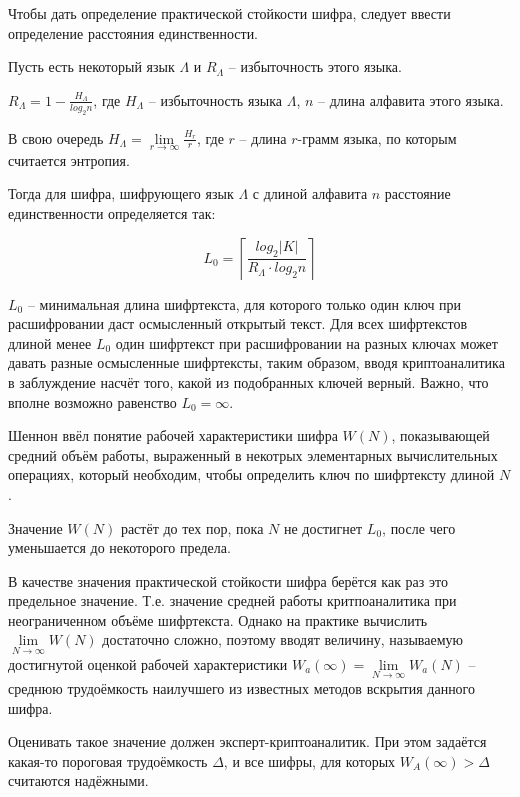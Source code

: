Чтобы дать определение практической стойкости шифра, следует ввести определение расстояния единственности.

Пусть есть некоторый язык $\Lambda$ и $R_{\Lambda}$ -- избыточность этого языка. 

$R_\Lambda = 1 - \frac{H_\Lambda}{log_2n}$, где $H_\Lambda$ -- избыточность языка $\Lambda$, $n$ -- длина алфавита этого языка.

В свою очередь $H_\Lambda =  \lim\limits_{r \rightarrow \infty} \frac{H_r}{r}$, где $r$ -- длина $r$-грамм языка, по которым считается энтропия. 

Тогда для шифра, шифрующего язык $\Lambda$ с длиной алфавита $n$ расстояние единственности определяется так:

$$ L_0 = \left \lceil \frac{log_2|K|}{R_\Lambda \cdot log_2n} \right \rceil $$ 

$L_0$ -- минимальная длина шифртекста, для которого только один ключ при расшифровании даст осмысленный открытый текст. Для всех шифртекстов длиной менее $L_0$ один шифртекст при расшифровании на разных ключах может давать разные осмысленные шифртексты, таким образом, вводя криптоаналитика в заблуждение насчёт того, какой из подобранных ключей верный. Важно, что вполне возможно равенство $L_0 = \infty$.

Шеннон ввёл понятие рабочей характеристики шифра $W(N)$, показывающей средний объём работы, выраженный в некотрых элементарных вычислительных операциях, который необходим, чтобы определить ключ по шифртексту длиной $N$. 

Значение $W(N)$ растёт до тех пор, пока $N$ не достигнет $L_0$, после чего уменьшается до некоторого предела. 

В качестве значения практической стойкости шифра берётся как раз это предельное значение. Т.е. значение средней работы критпоаналитика при неограниченном объёме шифртекста. Однако на практике вычислить $\lim\limits_{N \rightarrow \infty} W(N)$ достаточно сложно, поэтому вводят величину, называемую достигнутой оценкой рабочей характеристики $ W_a(\infty) = \lim\limits_{N \rightarrow \infty} W_a(N)$ -- среднюю трудоёмкость наилучшего из известных методов вскрытия данного шифра. 

Оценивать такое значение должен эксперт-криптоаналитик. При этом задаётся какая-то пороговая трудоёмкость $\Delta$, и все шифры, для которых $W_A(\infty) > \Delta$ считаются надёжными. 